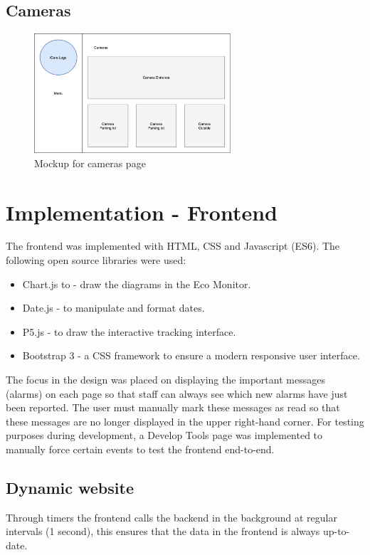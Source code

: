 \subsection{Cameras}
\begin{figure}[H]
	\centering
	\includegraphics[width =0.65\textwidth]{images/mockCameras.png}
	\caption{Mockup for cameras page}
\end{figure}


\section{Implementation - Frontend}

The frontend was implemented with HTML, CSS and Javascript (ES6).
The following open source libraries were used:
\begin{itemize}

\item Chart.js to -  draw the diagrams in the Eco Monitor.
\item Date.js - to manipulate and format dates.
\item P5.js - to draw the interactive tracking interface.
\item Bootstrap 3 - a CSS framework to ensure a modern responsive user interface.
\end{itemize}


The focus in the design was placed on displaying the important messages (alarms) on each page so that staff can always see which new alarms have just been reported.
The user must manually mark these messages as read so that these messages are no longer displayed in the upper right-hand corner. For testing purposes during development, a Develop Tools page was implemented to manually force certain events to test the frontend end-to-end.

\subsection{Dynamic website}
Through timers the frontend calls the backend in the background at regular intervals (1 second), this ensures that the data in the frontend is always up-to-date.



